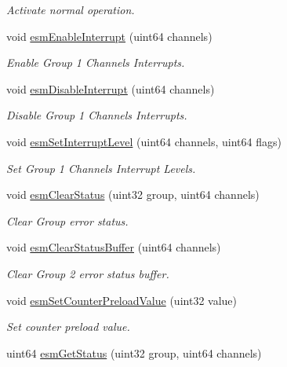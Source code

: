 \begin{DoxyCompactItemize}
\begin{DoxyCompactList}\small\item\em Activate normal operation. \end{DoxyCompactList}\item 
void \mbox{\hyperlink{group__ESM_gabac2a3061d7f581a62ed9f9ecde03108}{esm\+Enable\+Interrupt}} (uint64 channels)
\begin{DoxyCompactList}\small\item\em Enable Group 1 Channels Interrupts. \end{DoxyCompactList}\item 
void \mbox{\hyperlink{group__ESM_gae92827d82951a348b9faead01d1901d6}{esm\+Disable\+Interrupt}} (uint64 channels)
\begin{DoxyCompactList}\small\item\em Disable Group 1 Channels Interrupts. \end{DoxyCompactList}\item 
void \mbox{\hyperlink{group__ESM_ga5c933318570a1b946185cd09af973184}{esm\+Set\+Interrupt\+Level}} (uint64 channels, uint64 flags)
\begin{DoxyCompactList}\small\item\em Set Group 1 Channels Interrupt Levels. \end{DoxyCompactList}\item 
void \mbox{\hyperlink{group__ESM_ga437032c8dd6a0855da7e8102d4143a0a}{esm\+Clear\+Status}} (uint32 group, uint64 channels)
\begin{DoxyCompactList}\small\item\em Clear Group error status. \end{DoxyCompactList}\item 
void \mbox{\hyperlink{group__ESM_ga53317b0e54932b896152a14a365a6e35}{esm\+Clear\+Status\+Buffer}} (uint64 channels)
\begin{DoxyCompactList}\small\item\em Clear Group 2 error status buffer. \end{DoxyCompactList}\item 
void \mbox{\hyperlink{group__ESM_gac0c9d63eb56fc294c3845f53685ecf36}{esm\+Set\+Counter\+Preload\+Value}} (uint32 value)
\begin{DoxyCompactList}\small\item\em Set counter preload value. \end{DoxyCompactList}\item 
uint64 \mbox{\hyperlink{group__ESM_gaf37af0850a7b771316d79027a2f45390}{esm\+Get\+Status}} (uint32 group, uint64 channels)

\end{DoxyCompactItemize}
